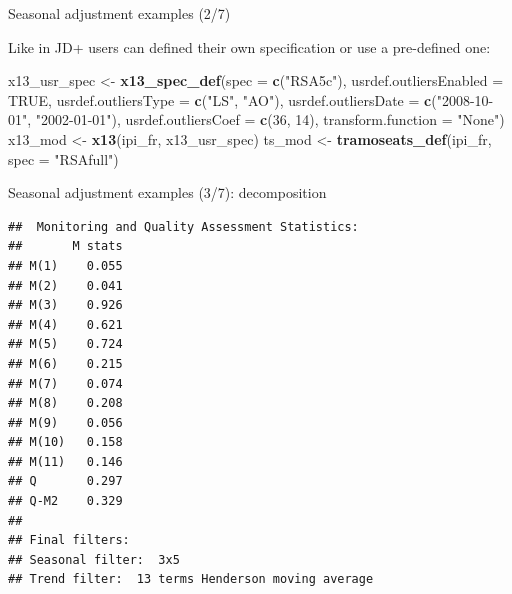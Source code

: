 \documentclass[10pt,xcolor=table,color={dvipsnames,usenames},ignorenonframetext,usepdftitle=false,french]{beamer}
\newenvironment{Shaded}{\begin{snugshade}}{\end{snugshade}}
\newcommand{\DataTypeTok}[1]{\textcolor[rgb]{0.13,0.29,0.53}{#1}}
\newcommand{\DecValTok}[1]{\textcolor[rgb]{0.00,0.00,0.81}{#1}}
\newcommand{\KeywordTok}[1]{\textcolor[rgb]{0.13,0.29,0.53}{\textbf{#1}}}
\newcommand{\NormalTok}[1]{#1}
\newcommand{\OperatorTok}[1]{\textcolor[rgb]{0.81,0.36,0.00}{\textbf{#1}}}
\newcommand{\OtherTok}[1]{\textcolor[rgb]{0.56,0.35,0.01}{#1}}
\newcommand{\StringTok}[1]{\textcolor[rgb]{0.31,0.60,0.02}{#1}}
\begin{document}
\begin{frame}[fragile]{Seasonal adjustment examples (2/7)}
\protect\hypertarget{seasonal-adjustment-examples-27}{}

Like in JD+ users can defined their own specification or use a
pre-defined one:

\footnotesize

\begin{Shaded}
\begin{Highlighting}[]
\NormalTok{x13_usr_spec <-}\StringTok{ }\KeywordTok{x13_spec_def}\NormalTok{(}\DataTypeTok{spec =} \KeywordTok{c}\NormalTok{(}\StringTok{"RSA5c"}\NormalTok{),}
                             \DataTypeTok{usrdef.outliersEnabled =} \OtherTok{TRUE}\NormalTok{,}
                             \DataTypeTok{usrdef.outliersType =} \KeywordTok{c}\NormalTok{(}\StringTok{"LS"}\NormalTok{, }\StringTok{"AO"}\NormalTok{),}
                             \DataTypeTok{usrdef.outliersDate =} \KeywordTok{c}\NormalTok{(}\StringTok{"2008-10-01"}\NormalTok{,}
                                                     \StringTok{"2002-01-01"}\NormalTok{),}
                             \DataTypeTok{usrdef.outliersCoef =} \KeywordTok{c}\NormalTok{(}\DecValTok{36}\NormalTok{, }\DecValTok{14}\NormalTok{),}
                             \DataTypeTok{transform.function =} \StringTok{"None"}\NormalTok{)}
\NormalTok{x13_mod <-}\StringTok{ }\KeywordTok{x13}\NormalTok{(ipi_fr, x13_usr_spec)}
\NormalTok{ts_mod <-}\StringTok{ }\KeywordTok{tramoseats_def}\NormalTok{(ipi_fr, }\DataTypeTok{spec =} \StringTok{"RSAfull"}\NormalTok{)}
\end{Highlighting}
\end{Shaded}

\end{frame}

\begin{frame}[fragile]{Seasonal adjustment examples (3/7):
decomposition}
\protect\hypertarget{seasonal-adjustment-examples-37-decomposition}{}

\footnotesize

\begin{Shaded}
\end{Shaded}

\begin{verbatim}
##  Monitoring and Quality Assessment Statistics:  
##       M stats
## M(1)    0.055
## M(2)    0.041
## M(3)    0.926
## M(4)    0.621
## M(5)    0.724
## M(6)    0.215
## M(7)    0.074
## M(8)    0.208
## M(9)    0.056
## M(10)   0.158
## M(11)   0.146
## Q       0.297
## Q-M2    0.329
## 
## Final filters: 
## Seasonal filter:  3x5
## Trend filter:  13 terms Henderson moving average
\end{verbatim}

\end{frame}
\end{document}
